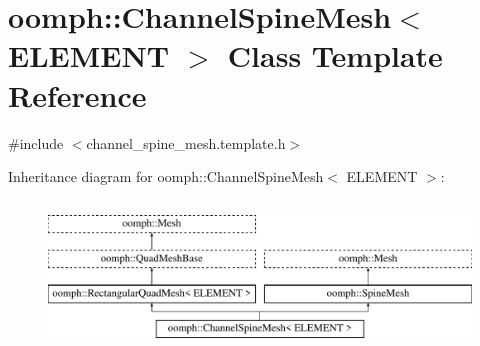 \hypertarget{classoomph_1_1ChannelSpineMesh}{}\section{oomph\+:\+:Channel\+Spine\+Mesh$<$ E\+L\+E\+M\+E\+NT $>$ Class Template Reference}
\label{classoomph_1_1ChannelSpineMesh}


{\ttfamily \#include $<$channel\+\_\+spine\+\_\+mesh.\+template.\+h$>$}

Inheritance diagram for oomph\+:\+:Channel\+Spine\+Mesh$<$ E\+L\+E\+M\+E\+NT $>$\+:\begin{figure}[H]
\begin{center}
\leavevmode
\includegraphics[height=4.000000cm]{classoomph_1_1ChannelSpineMesh}
\end{center}
\end{figure}
